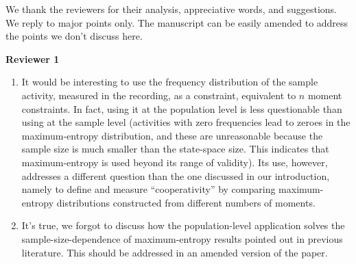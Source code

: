\documentclass{article}
\begin{document}
We thank the reviewers for their analysis, appreciative words, and
suggestions. We reply to major points only. The manuscript can be easily
amended to address the points we don't discuss here.

\textbf{Reviewer 1}
\begin{enumerate}
\item It would be interesting to use the frequency distribution of the
  sample activity, measured in the recording, as a constraint, equivalent
  to $n$ moment constraints. In fact, using it at the population level is
  less questionable than using at the sample level (activities with zero
  frequencies lead to zeroes in the maximum-entropy distribution, and these
  are unreasonable because the sample size is much smaller than the
  state-space size. This indicates that maximum-entropy is used beyond its
  range of validity). Its use, however, addresses a different question than
  the one discussed in our introduction, namely to define and measure
  \enquote{cooperativity} by comparing maximum-entropy distributions
  constructed from different numbers of moments.
\item It's true, we forgot to discuss how the population-level application
  solves the sample-size-dependence of maximum-entropy results pointed out in
  previous literature. This should be addressed in an amended version of
  the paper.
\end{enumerate}

\bigskip
\end{document}
